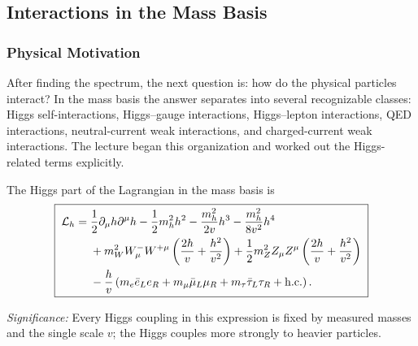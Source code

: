 
\subsection{Interactions in the Mass Basis}\label{subsec:lec18:mass-basis-interactions}

\subsubsection*{Physical Motivation}

After finding the spectrum, the next question is: how do the physical particles
interact? In the mass basis the answer separates into several recognizable
classes: Higgs self-interactions, Higgs--gauge interactions, Higgs--lepton
interactions, QED interactions, neutral-current weak interactions, and
charged-current weak interactions. The lecture began this organization and
worked out the Higgs-related terms explicitly.

The Higgs part of the Lagrangian in the mass basis is
\begin{equation}
  \boxed{\;
  \begin{aligned}
  \mathcal{L}_h={}&\frac12\partial_\mu h\partial^\mu h
  -\frac12m_h^2h^2
  -\frac{m_h^2}{2v}h^3
  -\frac{m_h^2}{8v^2}h^4 \\
  &+m_W^2W^-_\mu W^{+\mu}\left(\frac{2h}{v}+\frac{h^2}{v^2}\right)
  +\frac12m_Z^2Z_\mu Z^\mu\left(\frac{2h}{v}+\frac{h^2}{v^2}\right) \\
  &-\frac{h}{v}\left(m_e\bar e_Le_R+m_\mu\bar\mu_L\mu_R+m_\tau\bar\tau_L\tau_R+\mathrm{h.c.}\right) .
  \end{aligned}\;}
  \label{eq:lec18:higgs-interaction-lagrangian}
\end{equation}

\textit{Significance:} Every Higgs coupling in this expression is fixed by measured masses and the single scale $v$; the Higgs couples more strongly to heavier particles.

